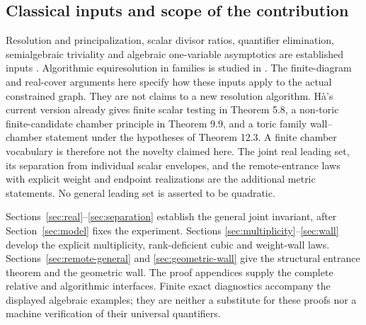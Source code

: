 \subsection*{Classical inputs and scope of the contribution}
Resolution and principalization, scalar divisor ratios, quantifier
elimination, semialgebraic triviality and algebraic one-variable
asymptotics are established inputs \cite{BM88,BM97,BM08,BE09,BPR06,BCR98,Hardt80}.
Algorithmic equiresolution in families is studied in \cite{ENV03}.
The finite-diagram and real-cover arguments here specify how these inputs
apply to the actual constrained graph. They are not claims to a new
resolution algorithm. H\`a's current version \cite{Ha26} already gives
finite scalar testing in Theorem 5.8, a non-toric finite-candidate chamber
principle in Theorem 9.9, and a toric family wall--chamber statement under
the hypotheses of Theorem 12.3. A finite chamber vocabulary is therefore
not the novelty claimed here. The joint real leading set, its separation
from individual scalar envelopes, and the remote-entrance laws with
explicit weight and endpoint realizations are the additional metric
statements. No general leading set is asserted to be quadratic.

Sections~\ref{sec:real}--\ref{sec:separation} establish the general joint
invariant, after Section~\ref{sec:model} fixes the experiment. Sections
\ref{sec:multiplicity}--\ref{sec:wall} develop the explicit multiplicity,
rank-deficient cubic and weight-wall laws. Sections~\ref{sec:remote-general}
and \ref{sec:geometric-wall} give the structural entrance theorem and the
geometric wall. The proof appendices supply the complete relative and
algorithmic interfaces. Finite exact diagnostics accompany the displayed
algebraic examples; they are neither a substitute for these proofs nor a
machine verification of their universal quantifiers.










\appendix



